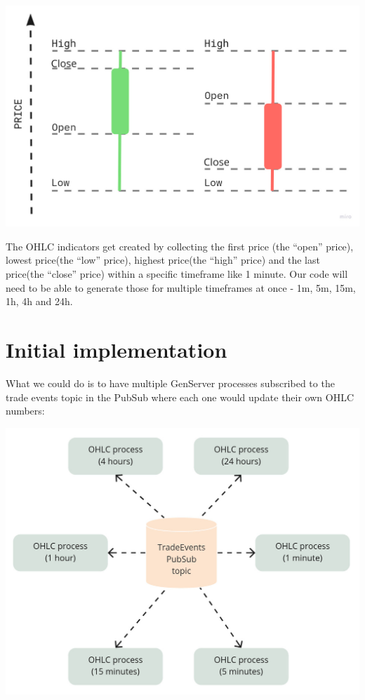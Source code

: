 \documentclass[
  oneside]{book}
\begin{document}
\begin{center}\includegraphics[width=1\linewidth]{images/chapter_19_01_ohlc_candle} \end{center}

The OHLC indicators get created by collecting the first price (the ``open'' price), lowest price(the ``low'' price), highest price(the ``high'' price) and the last price(the ``close'' price) within a specific timeframe like 1 minute. Our code will need to be able to generate those for multiple timeframes at once - 1m, 5m, 15m, 1h, 4h and 24h.

\section{Initial implementation}\label{initial-implementation}

What we could do is to have multiple GenServer processes subscribed to the trade events topic in the PubSub where each one would update their own OHLC numbers:

\begin{center}\includegraphics[width=1\linewidth]{images/chapter_19_02_multi_workers} \end{center}
\end{document}
